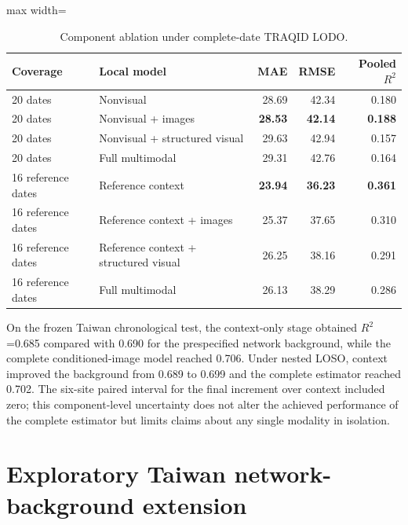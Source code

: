 \documentclass[review,12pt,authoryear]{elsarticle}
\newcommand{\Rtwo}{\ensuremath{R^2}}
\begin{document}
\begin{table}[H]
\centering
\caption{Component ablation under complete-date TRAQID LODO.}
\label{tab:ablation}
\begin{adjustbox}{max width=\textwidth}
\begin{tabular}{llrrr}
\toprule
Coverage & Local model & MAE & RMSE & Pooled \Rtwo \\
\midrule
20 dates & Nonvisual & 28.69 & 42.34 & 0.180 \\
20 dates & Nonvisual + images & \textbf{28.53} & \textbf{42.14} & \textbf{0.188} \\
20 dates & Nonvisual + structured visual & 29.63 & 42.94 & 0.157 \\
20 dates & Full multimodal & 29.31 & 42.76 & 0.164 \\
\midrule
16 reference dates & Reference context & \textbf{23.94} & \textbf{36.23} & \textbf{0.361} \\
16 reference dates & Reference context + images & 25.37 & 37.65 & 0.310 \\
16 reference dates & Reference context + structured visual & 26.25 & 38.16 & 0.291 \\
16 reference dates & Full multimodal & 26.13 & 38.29 & 0.286 \\
\bottomrule
\end{tabular}
\end{adjustbox}
\end{table}

On the frozen Taiwan chronological test, the context-only stage obtained
\Rtwo=0.685 compared with 0.690 for the prespecified network background, while
the complete conditioned-image model reached 0.706. Under nested LOSO, context
improved the background from 0.689 to 0.699 and the complete estimator reached
0.702. The six-site paired interval for the final increment over context
included zero; this component-level uncertainty does not alter the achieved
performance of the complete estimator but limits claims about any single
modality in isolation.

\section{Exploratory Taiwan network-background extension}
\label{app:taiwan-exploratory}
\end{document}
